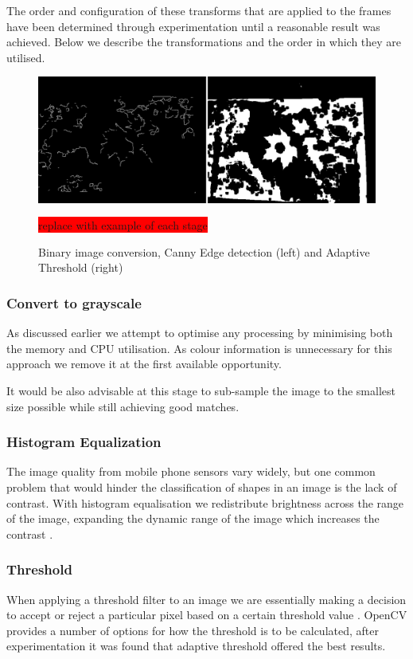 The order and configuration of these transforms that are applied to the frames have been determined through experimentation until a reasonable result was achieved. Below we describe the transformations and the order in which they are utilised.

\begin{figure}
\centering
    \includegraphics[width=1.0\textwidth]{leaf_identification/images/convert_to_binary.png}
    \caption{Binary image conversion, Canny Edge detection (left) and Adaptive Threshold (right)}%
    \label{preprocessing}
    \colorbox{red}{replace with example of each stage}
\end{figure}


\subsubsection{Convert to grayscale}
As discussed earlier we attempt to optimise any processing by minimising both the memory and CPU utilisation. As colour information is unnecessary for this approach we remove it at the first available opportunity.

It would be also advisable at this stage to sub-sample the image to the smallest size possible while still achieving good matches.

\subsubsection{Histogram Equalization}
The image quality from mobile phone sensors vary widely, but one common problem that would hinder the classification of shapes in an image is the lack of contrast. With histogram equalisation we redistribute brightness across the range of the image, expanding the dynamic range of the image which increases the contrast \cite{kuntz09}.


\subsubsection{Threshold}
When applying a threshold filter to an image we are essentially making a decision to accept or reject a particular pixel based on a certain threshold value \cite{bradski08}. OpenCV provides a number of options for how the threshold is to be calculated, after experimentation it was found that adaptive threshold offered the best results.

